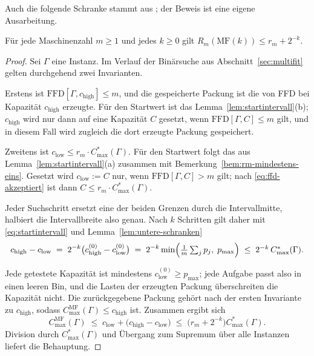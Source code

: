 Auch die folgende Schranke stammt aus \cite{coffman1978}; der Beweis ist eine eigene
Ausarbeitung.

\begin{theorem}
\label{thm:guete}
Für jede Maschinenzahl $m \ge 1$ und jedes $k \ge 0$ gilt
$R_m(\mathrm{MF}(k)) \le r_m + 2^{-k}$.
\end{theorem}

\begin{proof}
Sei $\Gamma$ eine Instanz.
Im Verlauf der Binärsuche aus Abschnitt~\ref{sec:multifit} gelten durchgehend zwei Invarianten.

Erstens ist $\mathrm{FFD}[\Gamma, c_{\mathrm{high}}] \le m$, und die gespeicherte Packung ist die
von FFD bei Kapazität $c_{\mathrm{high}}$ erzeugte.
Für den Startwert ist das Lemma~\ref{lem:startintervall}(b); $c_{\mathrm{high}}$ wird nur dann auf
eine Kapazität $C$ gesetzt, wenn $\mathrm{FFD}[\Gamma, C] \le m$ gilt, und in diesem Fall wird
zugleich die dort erzeugte Packung gespeichert.

Zweitens ist $c_{\mathrm{low}} \le r_m \cdot C^{*}_{\max}(\Gamma)$.
Für den Startwert folgt das aus Lemma~\ref{lem:startintervall}(a) zusammen mit
Bemerkung~\ref{bem:rm-mindestens-eins}.
Gesetzt wird $c_{\mathrm{low}} := C$ nur, wenn $\mathrm{FFD}[\Gamma, C] > m$ gilt; nach
\eqref{eq:ffd-akzeptiert} ist dann $C \le r_m \cdot C^{*}_{\max}(\Gamma)$.

Jeder Suchschritt ersetzt eine der beiden Grenzen durch die Intervallmitte, halbiert die
Intervallbreite also genau. Nach $k$ Schritten gilt daher mit \eqref{eq:startintervall} und
Lemma~\ref{lem:untere-schranken}
\[
  c_{\mathrm{high}} - c_{\mathrm{low}}
  \;=\; 2^{-k}\bigl(c_{\mathrm{high}}^{(0)} - c_{\mathrm{low}}^{(0)}\bigr)
  \;=\; 2^{-k} \min\Bigl( \tfrac{1}{m}\textstyle\sum_j p_j,\; p_{\max} \Bigr)
  \;\le\; 2^{-k}\, C^{*}_{\max}(\Gamma).
\]

Jede getestete Kapazität ist mindestens $c_{\mathrm{low}}^{(0)} \ge p_{\max}$; jede Aufgabe passt
also in einen leeren Bin, und die Lasten der erzeugten Packung überschreiten die Kapazität nicht.
Die zurückgegebene Packung gehört nach der ersten Invariante zu $c_{\mathrm{high}}$, sodass
$C^{\mathrm{MF}}_{\max}(\Gamma) \le c_{\mathrm{high}}$ ist. Zusammen ergibt sich
\[
  C^{\mathrm{MF}}_{\max}(\Gamma)
  \;\le\; c_{\mathrm{low}} + \bigl(c_{\mathrm{high}} - c_{\mathrm{low}}\bigr)
  \;\le\; \bigl(r_m + 2^{-k}\bigr) C^{*}_{\max}(\Gamma).
\]
Division durch $C^{*}_{\max}(\Gamma)$ und Übergang zum Supremum über alle Instanzen liefert die
Behauptung.
\end{proof}

